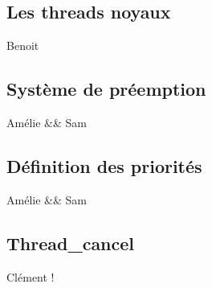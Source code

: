 \subsection{Les threads noyaux}
Benoit

\subsection{Système de préemption}

Amélie && Sam

\subsection{Définition des priorités}

Amélie && Sam

\subsection{Thread_cancel}

Clément !

